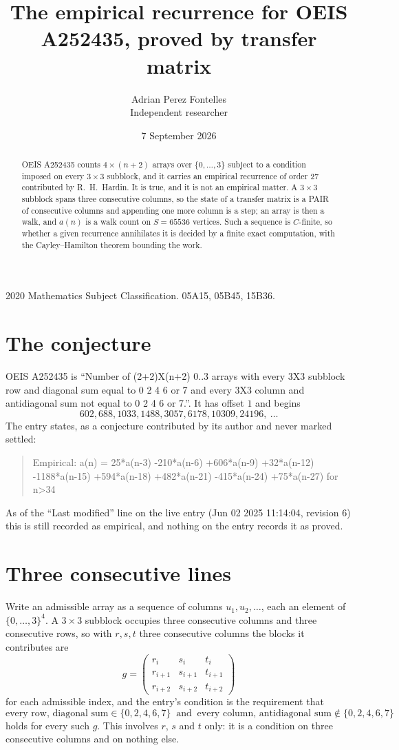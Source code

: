 \documentclass[11pt,a4paper]{article}
\title{The empirical recurrence for OEIS A252435, proved by transfer matrix}
\author{Adrian Perez Fontelles\\ \small Independent researcher}
\date{7 September 2026}
\theoremstyle{plain}
\theoremstyle{definition}
\begin{document}
\maketitle

\begin{abstract}
OEIS A252435 counts $4\times(n+2)$ arrays over $\{0,\dots,3\}$ subject to a condition imposed on
every $3\times3$ subblock, and it carries an empirical recurrence of order $27$
contributed by R.~H.~Hardin. It is true, and it is not an empirical matter. A $3\times3$
subblock spans three consecutive columns, so the state of a transfer matrix is a PAIR of
consecutive columns and appending one more column is a step; an array is then a walk, and
$a(n)$ is a walk count on $S=65536$ vertices. Such a sequence is $C$-finite, so whether a given
recurrence annihilates it is decided by a finite exact computation, with the Cayley--Hamilton
theorem bounding the work.
\end{abstract}

\noindent\small 2020 Mathematics Subject Classification. 05A15, 05B45, 15B36.\normalsize

\section{The conjecture}

OEIS A252435 is ``Number of (2+2)X(n+2) 0..3 arrays with every 3X3 subblock row and diagonal sum equal to 0 2 4 6 or 7 and every 3X3 column and antidiagonal sum not equal to 0 2 4 6 or 7.''. It has offset $1$ and begins
\[
602, 688, 1033, 1488, 3057, 6178, 10309, 24196,\ \dots
\]
The entry states, as a conjecture contributed by its author and never marked settled:
\begin{quote}
Empirical: a(n) = 25*a(n-3) -210*a(n-6) +606*a(n-9) +32*a(n-12) -1188*a(n-15) +594*a(n-18) +482*a(n-21) -415*a(n-24) +75*a(n-27) for n>34
\end{quote}
As of the ``Last modified'' line on the live entry (Jun 02 2025 11:14:04, revision 6) this is still
recorded as empirical, and nothing on the entry records it as proved.

\section{Three consecutive lines}

Write an admissible array as a sequence of columns $u_1,u_2,\dots$, each an element of
$\{0,\dots,3\}^{4}$. A $3\times3$ subblock occupies three consecutive columns and
three consecutive rows, so with $r,s,t$ three consecutive columns the blocks it
contributes are
\[
g=\begin{pmatrix}r_i&s_i&t_i\\ r_{i+1}&s_{i+1}&t_{i+1}\\ r_{i+2}&s_{i+2}&t_{i+2}\end{pmatrix}
\]
for each admissible index, and the entry's condition is the requirement that
\[
\text{every row, diagonal sum} \in \{0,2,4,6,7\}\ \text{ and }\ \text{every column, antidiagonal sum} \notin \{0,2,4,6,7\}
\]
holds for every such $g$. This involves $r$, $s$ and $t$ only: it is a condition on
three consecutive columns and on nothing else.
\end{document}
